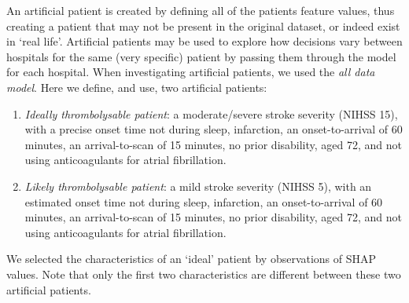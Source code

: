 An artificial patient is created by defining all of the patients feature values, thus creating a patient that may not be present in the original dataset, or indeed exist in `real life'. Artificial patients may be used to explore how decisions vary between hospitals for the same (very specific) patient by passing them through the model for each hospital. When investigating artificial patients, we used the \emph{all data model}. Here we define, and use, two artificial patients: 
\begin{enumerate}
    \item \emph{Ideally thrombolysable patient}: a moderate/severe stroke severity (NIHSS 15), with a precise onset time not during sleep, infarction, an onset-to-arrival of 60 minutes, an arrival-to-scan of 15 minutes, no prior disability, aged 72, and not using anticoagulants for atrial fibrillation.
    \item \emph{Likely thrombolysable patient}: a mild stroke severity (NIHSS 5), with an estimated onset time not during sleep, infarction, an onset-to-arrival of 60 minutes, an arrival-to-scan of 15 minutes, no prior disability, aged 72, and not using anticoagulants for atrial fibrillation. 
\end{enumerate}

We selected the characteristics of an `ideal' patient by observations of SHAP values. Note that only the first two characteristics are different between these two artificial patients.